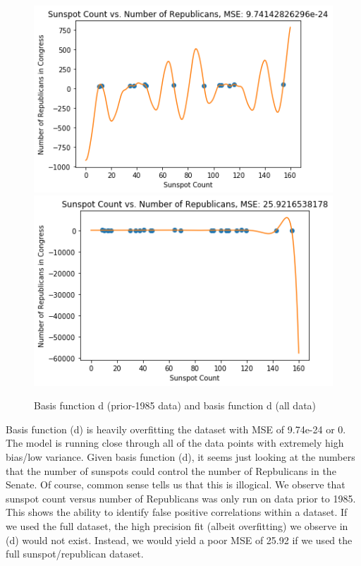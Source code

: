 \documentclass[submit]{harvardml}
\begin{document}
\begin{figure}[!htbp]
\begin{center}
    \includegraphics[scale=.5]{24.png}
    \includegraphics[scale=.5]{241.png}
    \caption{Basis function d (prior-1985 data) and basis function d (all data)}
\end{center}
\end{figure}

Basis function (d) is heavily overfitting the dataset with MSE of 9.74e-24 or 0. The model is running close through all of the data points with extremely high bias/low variance. Given basis function (d), it seems just looking at the numbers that the number of sunspots could control the number of Repbulicans in the Senate. Of course, common sense tells us that this is illogical. We observe that sunspot count versus number of Republicans was only run on data prior to 1985. This shows the ability to identify false positive correlations within a dataset. If we used the full dataset, the high precision fit (albeit overfitting) we observe in (d) would not exist. Instead, we would yield a poor MSE of 25.92 if we used the full sunspot/republican dataset.
\end{document}
